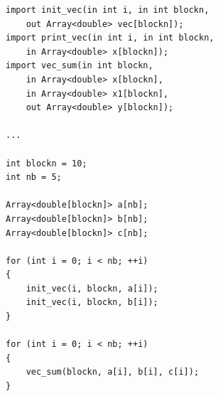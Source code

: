 \documentclass[conference]{IEEEtran}
\begin{document}
\begin{lstlisting}[frame=single]
import init_vec(in int i, in int blockn,
	out Array<double> vec[blockn]);
import print_vec(in int i, in int blockn,
	in Array<double> x[blockn]);
import vec_sum(in int blockn,
	in Array<double> x[blockn],
	in Array<double> x1[blockn],
	out Array<double> y[blockn]);

...

int blockn = 10;
int nb = 5;

Array<double[blockn]> a[nb];
Array<double[blockn]> b[nb];
Array<double[blockn]> c[nb];

for (int i = 0; i < nb; ++i)
{
	init_vec(i, blockn, a[i]);
	init_vec(i, blockn, b[i]);
}

for (int i = 0; i < nb; ++i)
{
	vec_sum(blockn, a[i], b[i], c[i]);
}
\end{lstlisting}
\end{document}
